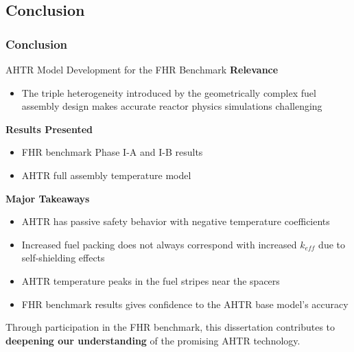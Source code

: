 \subsection{Conclusion}
\begin{frame}
    \frametitle{Conclusion}
    \begin{block}{AHTR Model Development for the FHR Benchmark}
        \small
        \textbf{Relevance}
        \begin{itemize}
            \item The triple heterogeneity introduced by the geometrically complex 
            fuel assembly design makes accurate reactor physics simulations challenging
        \end{itemize}
        \textbf{Results Presented} 
        \begin{itemize}
            \item FHR benchmark Phase I-A and I-B results
            \item AHTR full assembly temperature model 
        \end{itemize}
        \textbf{Major Takeaways} 
        \begin{itemize}
            \item AHTR has passive safety behavior with negative temperature coefficients
            \item Increased fuel packing does not always correspond with increased 
            $k_{eff}$ due to self-shielding effects 
            \item AHTR temperature peaks in the fuel stripes near the spacers 
            \item FHR benchmark results gives confidence to the AHTR base model's accuracy
        \end{itemize}
    \end{block}

    Through participation in the FHR benchmark, this dissertation contributes to 
    \textbf{deepening our understanding} of the promising \gls{AHTR} technology. 
\end{frame}

